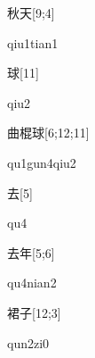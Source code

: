 \begin{verbete}{秋天}[9;4]
\begin{pronuncia}{qiu1tian1}
\end{pronuncia}
\end{verbete}

\begin{verbete}[qiu2]{球}[11]
\begin{pronuncia}{qiu2}
\end{pronuncia}
\end{verbete}

\begin{verbete}{曲棍球}[6;12;11]
\begin{pronuncia}{qu1gun4qiu2}
\end{pronuncia}
\end{verbete}

\begin{verbete}[qu4]{去}[5]
\begin{pronuncia}{qu4}
\end{pronuncia}
\end{verbete}

\begin{verbete}[qu4nian2]{去年}[5;6]
\begin{pronuncia}{qu4nian2}
\end{pronuncia}
\end{verbete}

\begin{verbete}[qun2zi0]{裙子}[12;3]
\begin{pronuncia}{qun2zi0}
\end{pronuncia}
\end{verbete}

